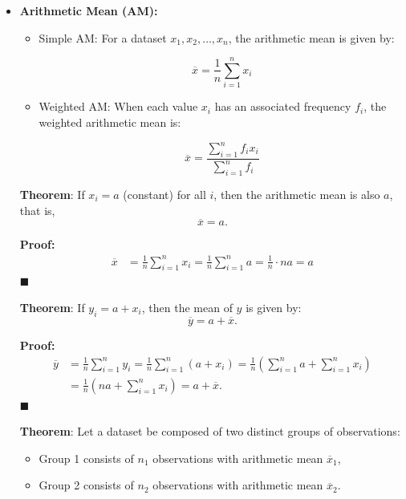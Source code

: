 \documentclass[twoside]{book}
\begin{document}
\begin{itemize}
    \item \textbf{Arithmetic Mean (AM):}
    \begin{itemize}
        \item Simple AM: For a dataset \( x_1, x_2, \dots, x_n \), the arithmetic mean is given by:
    \begin{textbox}
    \[
    \overline{x} = \dfrac{1}{n} \sum_{i=1}^{n} x_i
    \]
    \end{textbox}
    \item Weighted AM: When each value \( x_i \) has an associated frequency \( f_i \), the weighted arithmetic mean is:
    \begin{textbox}
    \[
    \overline{x} = \dfrac{\sum_{i=1}^{n} f_i x_i}{\sum_{i=1}^{n} f_i}
    \]
    \end{textbox}
    \end{itemize}

\begin{textbox}
        \textbf{Theorem}: If \( x_i = a \) (constant) for all \( i \), then the arithmetic mean is also \( a \), that is,
\[
\overline{x} = a.
\]
\end{textbox}

\textbf{Proof:}
\begin{align*}
\overline{x} &= \frac{1}{n} \sum_{i=1}^n x_i
       = \frac{1}{n} \sum_{i=1}^n a = \frac{1}{n} \cdot n a = a
\end{align*}
\hfill $\blacksquare$

\begin{textbox}
\textbf{Theorem}: If \( y_i = a + x_i \), then the mean of \( y \) is given by:
\[
\overline{y} = a + \overline{x}.
\]
\end{textbox}

\textbf{Proof:}
\begin{align*}
\overline{y} &= \frac{1}{n} \sum_{i=1}^n y_i = \frac{1}{n} \sum_{i=1}^n (a + x_i) = \frac{1}{n} \left( \sum_{i=1}^n a + \sum_{i=1}^n x_i \right) \\
       &= \frac{1}{n} \left( n a + \sum_{i=1}^n x_i \right) = a + \overline{x}.
\end{align*}
\hfill $\blacksquare$

\begin{textbox}
\textbf{Theorem}: Let a dataset be composed of two distinct groups of observations:

\begin{itemize}
  \item Group 1 consists of \( n_1 \) observations with arithmetic mean \( \overline{x}_1 \),
  \item Group 2 consists of \( n_2 \) observations with arithmetic mean \( \overline{x}_2 \).
\end{itemize}


\end{textbox}
\end{itemize}
\end{document}
